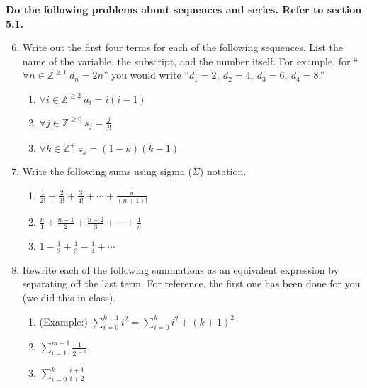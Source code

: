 \documentclass[12pt, letterpaper]{report}
\newcommand{\Z}{\mathbb{Z}}
\begin{document}
\bigskip
\textbf{Do the following problems about sequences and series.  Refer to section 5.1.}

\begin{enumerate}\setcounter{enumi}{5}
        
\item Write out the first four terms for each of the following sequences.  List the name
of the variable, the subscript, and the number itself.  For example, for ``$\forall n 
\in \Z^{\geq 1} \ d_n = 2n$'' you would write ``$d_1 = 2, \ d_2 = 4, \ d_3 = 6, \ d_4 = 8$.''

\begin{enumerate}
        \item $\forall i \in \Z^{\geq 2} \ a_i = i(i-1)$
        \item $\displaystyle \forall j \in \Z^{\geq 0} \ s_j = \frac{j}{j!}$
        \item $\displaystyle \forall k \in \Z^+ \ z_k = (1-k)(k-1)$
\end{enumerate}

\item Write the following sums using sigma ($\Sigma$) notation.

\begin{enumerate}

        \item $\displaystyle \frac{1}{2!} + \frac{2}{3!} + \frac{3}{4!} + \cdots + \frac{n}{(n+1)!}$
        \item $\displaystyle \frac{n}{1} + \frac{n-1}{2} + \frac{n-2}{3} + \cdots + \frac{1}{n}$        
        \item $\displaystyle 1 - \frac{1}{2} + \frac{1}{3} - \frac{1}{4} + \cdots$

\end{enumerate}

\item Rewrite each of the following summations as an equivalent expression by separating off the last term.
For reference, the first one has been done for you (we did this in class).

\begin{enumerate}

        \item (Example:) $\displaystyle \sum_{i=0}^{k+1}{i^2} = \sum_{i=0}^{k}{i^2} + (k+1)^2$
        \item $\displaystyle \sum_{i=1}^{m+1}{\frac{1}{2^{i-1}}}$ 
        \item $\displaystyle \sum_{i=0}^{k}{\frac{i+1}{i+2}}$

\end{enumerate}

\end{enumerate}
\end{document}
